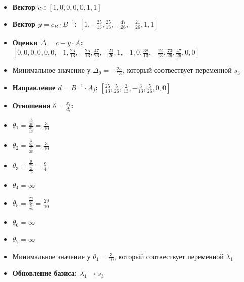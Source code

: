 \begin{itemize}
\begin{itemize}
\item \textbf{Вектор $c_b$:}
$[1, 0, 0, 0, 0, 1, 1]$
\item \textbf{Вектор $y = c_B \cdot B^{-1}$:}
$[1, - \frac{25}{13}, \frac{25}{13}, - \frac{47}{26}, - \frac{21}{26}, 1, 1]$
\item \textbf{Оценки $\Delta = c - y \cdot A$:}
$[0, 0, 0, 0, 0, 0, -1, \frac{25}{13}, - \frac{25}{13}, \frac{47}{26}, - \frac{21}{26}, 1, -1, 0, \frac{38}{13}, - \frac{12}{13}, \frac{73}{26}, \frac{47}{26}, 0, 0]$
\item Минимальное значение у  $\Delta_{9} = - \frac{25}{13}$, который соотвествует переменной $s_3$
\item \textbf{Направление $d = B^{-1} \cdot A_j$:}
$[\frac{25}{13}, \frac{5}{26}, \frac{2}{13}, - \frac{3}{13}, \frac{5}{26}, 0, 0]$
\item \textbf{Отношения $\theta = \frac{x_i}{d_i}$:}
\item $\theta_{1} = \frac{\frac{15}{26}}{\frac{25}{13}} = \frac{3}{10}$
\item $\theta_{2} = \frac{\frac{3}{52}}{\frac{5}{26}} = \frac{3}{10}$
\item $\theta_{3} = \frac{\frac{9}{26}}{\frac{2}{13}} = \frac{9}{4}$
\item $\theta_{4} = \infty$
\item $\theta_{5} = \frac{\frac{29}{52}}{\frac{5}{26}} = \frac{29}{10}$
\item $\theta_{6} = \infty$
\item $\theta_{7} = \infty$
\item Минимальное значение у  $\theta_{1} = \frac{3}{10}$, который соотвествует переменной $\lambda_1$
\item \textbf{Обновление базиса: $\lambda_1 \rightarrow s_3$}
\end{itemize}
\newpage

\end{itemize}
